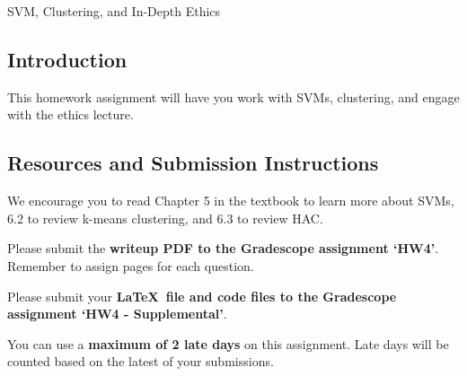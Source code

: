 \documentclass[submit]{../harvardml}
\begin{document}
\begin{center}
{\Large SVM, Clustering, and In-Depth Ethics}\\
\end{center}

\subsection*{Introduction}

This homework assignment will have you work with SVMs, clustering, and engage with the ethics lecture.

\subsection*{Resources and Submission Instructions}
We encourage you to
read Chapter 5 in the textbook to learn more about SVMs, 6.2 to review k-means clustering, and 6.3 to review HAC. %

Please submit the \textbf{writeup PDF to the Gradescope assignment `HW4'}. Remember to assign pages for each question.

Please submit your \textbf{\LaTeX\ file and code files to the Gradescope assignment `HW4 - Supplemental'}. 

You can use a \textbf{maximum of 2 late days} on this assignment.  Late days will be counted based on the latest of your submissions. 

\newpage
\end{document}
